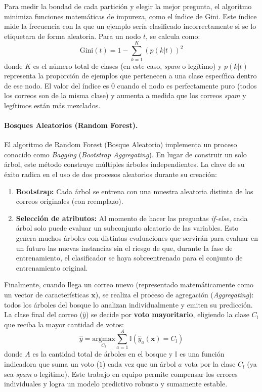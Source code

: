 \documentclass[a4paper,11pt]{book}
\begin{document}
Para medir la bondad de cada partición y elegir la mejor pregunta, el algoritmo minimiza funciones matemáticas de impureza, como el índice de Gini. Este índice mide la frecuencia con la que un ejemplo sería clasificado incorrectamente si se lo etiquetara de forma aleatoria. Para un nodo $t$, se calcula como:
\begin{equation}
\text{Gini}(t) = 1 - \sum_{k=1}^{K} \left( p(k|t) \right)^2
\label{eq:gini}
\end{equation}
donde $K$ es el número total de clases (en este caso, \textit{spam} o legítimo) y $p(k|t)$ representa la proporción de ejemplos que pertenecen a una clase específica dentro de ese nodo. El valor del índice es $0$ cuando el nodo es perfectamente puro (todos los correos son de la misma clase) y aumenta a medida que los correos \textit{spam} y legítimos están más mezclados.

\paragraph{Bosques Aleatorios (Random Forest).} El algoritmo de Random Forest (Bosque Aleatorio) implementa un proceso conocido como \textit{Bagging} (\textit{Bootstrap Aggregating}). En lugar de construir un solo árbol, este método construye múltiples árboles independientes. La clave de su éxito radica en el uso de dos procesos aleatorios durante su creación:
\begin{enumerate}
    \item \textbf{Bootstrap:} Cada árbol se entrena con una muestra aleatoria distinta de los correos originales (con reemplazo).
    \item \textbf{Selección de atributos:} Al momento de hacer las preguntas \textit{if-else}, cada árbol solo puede evaluar un subconjunto aleatorio de las variables. Esto genera muchos árboles con distintas evaluaciones que servirán para evaluar en un futuro las nuevas instancias sin el riesgo de que, durante la fase de entrenamiento, el clasificador se haya sobreentrenado para el conjunto de entrenamiento original.
\end{enumerate}

Finalmente, cuando llega un correo nuevo (representado matemáticamente como un vector de características $\boldsymbol{x}$), se realiza el proceso de agregación (\textit{Aggregating}): todos los árboles del bosque lo analizan individualmente y emiten su predicción. La clase final del correo ($\widehat{y}$) se decide por \textbf{voto mayoritario}, eligiendo la clase $C_l$ que reciba la mayor cantidad de votos:
\begin{equation}
\widehat{y} = \underset{C_l}{\text{argmax}} \sum_{a=1}^{A} \mathbb{I}(\widehat{y}_a(\boldsymbol{x}) = C_l)
\label{eq:rf_voting}
\end{equation}
donde $A$ es la cantidad total de árboles en el bosque y $\mathbb{I}$ es una función indicadora que suma un voto ($1$) cada vez que un árbol $a$ vota por la clase $C_l$ (ya sea \textit{spam} o legítimo). Este trabajo en equipo permite compensar los errores individuales y logra un modelo predictivo robusto y sumamente estable.
\end{document}

